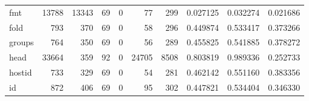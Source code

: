 \begin{longtable}{lrrrrrrrrr}
fmt       &                                              13788 &                                              13343 &                                                 69 &                                                  0 &                                                 77 &                                                299 &                                           0.027125 &                               0.032274 &                             0.021686 \\
fold      &                                                793 &                                                370 &                                                 69 &                                                  0 &                                                 58 &                                                296 &                                           0.449874 &                               0.533417 &                             0.373266 \\
groups    &                                                764 &                                                350 &                                                 69 &                                                  0 &                                                 56 &                                                289 &                                           0.455825 &                               0.541885 &                             0.378272 \\
head      &                                              33664 &                                                359 &                                                 92 &                                                  0 &                                              24705 &                                               8508 &                                           0.803819 &                               0.989336 &                             0.252733 \\
hostid    &                                                733 &                                                329 &                                                 69 &                                                  0 &                                                 54 &                                                281 &                                           0.462142 &                               0.551160 &                             0.383356 \\
id        &                                                872 &                                                406 &                                                 69 &                                                  0 &                                                 95 &                                                302 &                                           0.447821 &                               0.534404 &                             0.346330 \\

\end{longtable}
